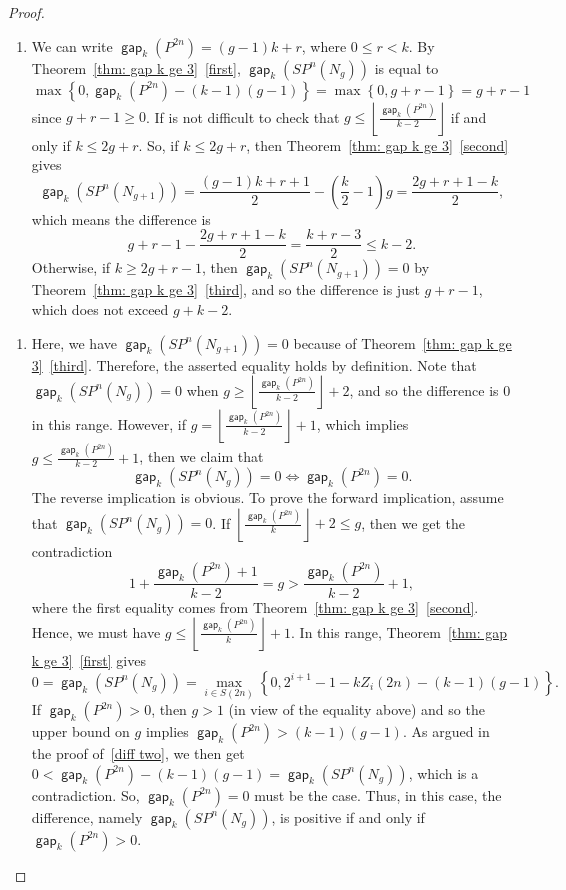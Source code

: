 \documentclass[amscd,amssymb,verbatim,10pt]{amsart}
\numberwithin{equation}{section}
\theoremstyle{plain}
\theoremstyle{definition}
\DeclareMathOperator{\gap}{{\mathsf{gap}}}
\begin{document}
\begin{proof}
\begin{enumerate}[(4)]
   \item We can write $\gap_k(P^{2n})=(g-1)k+r$, where $0\le r<k$. By Theorem~\ref{thm: gap k ge 3}~\eqref{first}, $\gap_k(SP^n(N_g))$ is equal to
   \[
   \max\left\{0,\gap_k(P^{2n})-(k-1)(g-1)\right\}=\max\left\{0,g+r-1\right\}=g+r-1
   \]
   since $g+r-1\ge 0$. If is not difficult to check that $g\le\left\lfloor\tfrac{\gap_k(P^{2n})}{k-2}\right\rfloor$ if and only if $k\le 2g+r$. So, if $k\le 2g+r$, then Theorem~\ref{thm: gap k ge 3}~\eqref{second} gives
   \[
   \gap_k(SP^n(N_{g+1}))=\frac{(g-1)k+r+1}{2}-\left(\frac{k}{2}-1\right)g=\frac{2g+r+1-k}{2},
   \]
   which means the difference is
   \[
    g+r-1-\frac{2g+r+1-k}{2}=\frac{k+r-3}{2}\le k-2.
   \]
   Otherwise, if $k\ge 2g+r-1$, then $\gap_k(SP^n(N_{g+1}))=0$ by Theorem~\ref{thm: gap k ge 3}~\eqref{third}, and so the difference is just $g+r-1$, which does not exceed $g+k-2$.
\end{enumerate}


\begin{enumerate}[(6)]
    \item Here, we have $\gap_k(SP^n(N_{g+1}))=0$ because of Theorem~\ref{thm: gap k ge 3}~\eqref{third}. Therefore, the asserted equality holds by definition. Note that $\gap_k(SP^n(N_{g}))=0$ when $g\ge \left\lfloor \tfrac{\gap_k(P^{2n})}{k-2} \right\rfloor+2$, and so the difference is $0$ in this range. However, if $g=\left\lfloor \tfrac{\gap_k(P^{2n})}{k-2} \right\rfloor+1$, which implies $g\le\tfrac{\gap_k(P^{2n})}{k-2}+1$, then we claim that 
\[
\gap_k(SP^n(N_{g}))=0\iff\gap_k(P^{2n})=0.
\]
The reverse implication is obvious. To prove the forward implication, assume that $\gap_k(SP^n(N_{g}))=0$. If $\left\lfloor\frac{\gap_k(P^{2n})}{k}\right\rfloor+2\le g$, then we get the contradiction
\[
1+\frac{\gap_k(P^{2n})+1}{k-2}=g>\frac{\gap_k(P^{2n})}{k-2}+1,
\]
where the first equality comes from Theorem~\ref{thm: gap k ge 3}~\eqref{second}. Hence, we must have $g\le\left\lfloor\tfrac{\gap_k(P^{2n})}{k}\right\rfloor+1$. In this range, Theorem~\ref{thm: gap k ge 3}~\eqref{first} gives
\[
0=\gap_k(SP^n(N_g))=\max_{i\in S(2n)}\left\{0,2^{i+1}-1-kZ_i(2n)-(k-1)(g-1) \right\}.
\]
If $\gap_k(P^{2n})>0$, then $g>1$ (in view of the equality above) and so the upper bound on $g$ implies $\gap_k(P^{2n})>(k-1)(g-1)$. As argued in the proof of~\eqref{diff two}, we then get $0<\gap_k(P^{2n})-(k-1)(g-1)=\gap_k(SP^n(N_g))$, which is a contradiction. So, $\gap_k(P^{2n})=0$ must be the case. Thus, in this case, the difference, namely $\gap_k(SP^n(N_g))$, is positive if and only if $\gap_k(P^{2n})>0$. 
\end{enumerate}
\end{proof}
\end{document}
